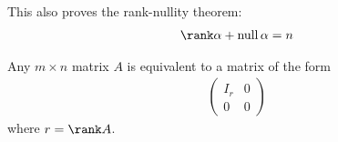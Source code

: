     \begin{remark}
        This also proves the rank-nullity theorem:
        \begin{align*}
            \rank \alpha + \operatorname{null} \alpha = n
        \end{align*}
    \end{remark}
    \begin{corollary}
        Any $m \times n$ matrix $A$ is equivalent to a matrix of the form
        \begin{align*}
            \begin{pmatrix}
                I_r & 0 \\
                0   & 0
            \end{pmatrix}
        \end{align*}
        where $r = \rank A$.
    \end{corollary}

